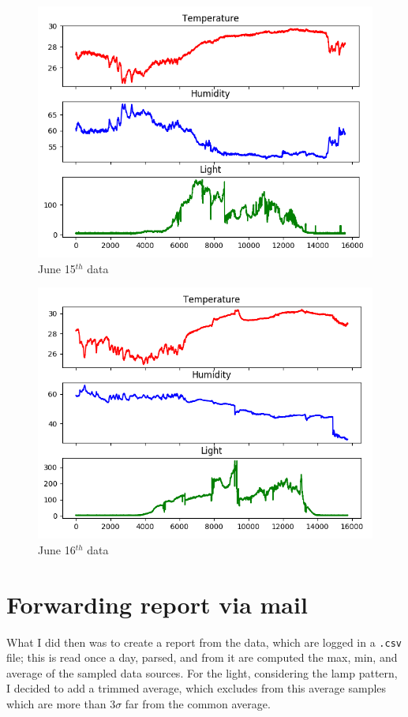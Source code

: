\documentclass[11pt]{article}
\begin{document}
\begin{figure}[h]
\includegraphics[width=\textwidth]{log-20170515}
\caption{June 15$^{th}$ data}
\label{fig:june15}
\end{figure}

\begin{figure}[h]
\includegraphics[width=\textwidth]{log-20170516}
\caption{June 16$^{th}$ data}
\label{fig:june16}
\end{figure}

\section{Forwarding report via mail}
What I did then was to create a report from the data, which are logged in a \texttt{.csv} file; this is read once a day, parsed, and from it are computed the max, min, and average of the sampled data sources. For the light, considering the lamp pattern, I decided to add a trimmed average, which excludes from this average samples which are more than $3\sigma$ far from the common average.
\end{document}
